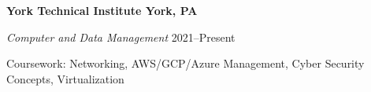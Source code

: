 \textbf{York Technical Institute \hfill York, PA} \par
\textit{Computer and Data Management} \hfill 2021--Present\par
Coursework: Networking, AWS/GCP/Azure Management, Cyber Security Concepts, Virtualization \par
